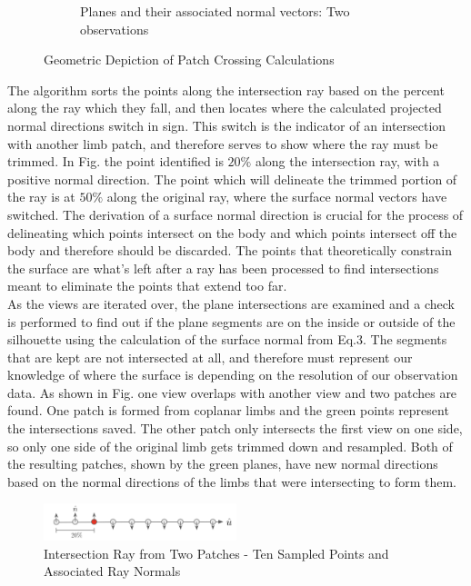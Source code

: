 \begin{figure}
\begin{subfigure}[b]{0.49\textwidth}
        \caption{Planes and their associated normal vectors: Two observations}
    \end{subfigure}
    \caption{Geometric Depiction of Patch Crossing Calculations}
    \label{fig:twoplanes}
\end{figure}
The algorithm sorts the points along the intersection ray based on the percent along the ray which they fall, and then locates where the calculated projected normal directions switch in sign. This switch is the indicator of an intersection with another limb patch, and therefore serves to show where the ray must be trimmed.
In Fig.%
the point identified is $20\%$ along the intersection ray, with a positive normal direction. The point which will delineate the trimmed portion of the ray is at $50\%$ along the original ray, where the surface normal vectors have switched. The derivation of a surface normal direction is crucial for the process of delineating which points intersect on the body and which points intersect off the body and therefore should be discarded. The points that theoretically constrain the surface are what's left after a ray has been processed to find intersections meant to eliminate the points that extend too far. 
\\ As the views are iterated over, the plane intersections are examined and a check is performed to find out if the plane segments are on the inside or outside of the silhouette using the calculation of the surface normal from Eq.3. The segments that are kept are not intersected at all, and therefore must represent our knowledge of where the surface is depending on the resolution of our observation data. As shown in Fig.%
 one view overlaps with another view and two patches are found. One patch is formed from coplanar limbs and the green points represent the intersections saved. The other patch only intersects the first view on one side, so only one side of the original limb gets trimmed down and resampled. Both of the resulting patches, shown by the green planes, have new normal directions based on the normal directions of the limbs that were intersecting to form them. 
\begin{figure}
    \centering
    \vspace{-10pt}
    \captionsetup{justification=centering}
    \includegraphics[width = 0.5\textwidth]{fig/line_pts_norms.png}
    \caption{Intersection Ray from Two Patches - Ten Sampled Points and Associated Ray Normals}
    \label{fig:line_pts}
\end{figure}
